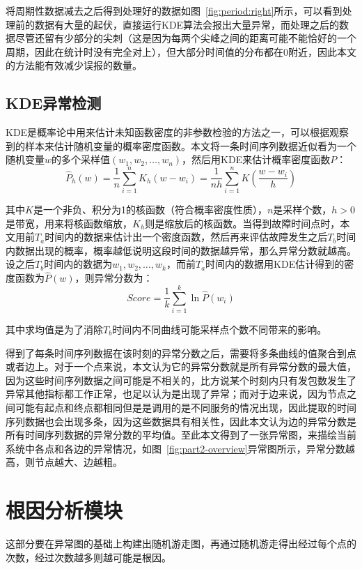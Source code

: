 将周期性数据减去之后得到处理好的数据如图~\ref{fig:period:right}所示，可以看到处理前的数据有大量的起伏，直接运行KDE算法会报出大量异常，而处理之后的数据尽管还留有少部分的尖刺（这是因为每两个尖峰之间的距离可能不能恰好的一个周期，因此在统计时没有完全对上），但大部分时间值的分布都在0附近，因此本文的方法能有效减少误报的数量。

\subsection{KDE异常检测}
KDE是概率论中用来估计未知函数密度的非参数检验的方法之一，可以根据观察到的样本来估计随机变量的概率密度函数。本文将一条时间序列数据近似看为一个随机变量$w$的多个采样值$(w_1,w_2,\dots,w_n)$，然后用KDE来估计概率密度函数$P$：
\begin{equation*}
\hat{P}_h(w) = \frac{1}{n}\sum_{i=1}^nK_h(w-w_i) = \frac{1}{nh}\sum_{i=1}^nK(\frac{w-w_i}{h})
\end{equation*}

其中$K$是一个非负、积分为1的核函数（符合概率密度性质），$n$是采样个数，$h>0$是带宽，用来将核函数缩放，$K_h$则是缩放后的核函数。当得到故障时间点时，本文用前$T_a$时间内的数据来估计出一个密度函数，然后再来评估故障发生之后$T_b$时间内数据出现的概率，概率越低说明这段时间的数据越异常，那么异常分数就越高。设之后$T_b$时间内的数据为$w_1,w_2,\dots,w_k$，而前$T_a$时间内的数据用KDE估计得到的密度函数为$\hat{P}(w)$，则异常分数为：
\begin{equation*}
  Score = \frac{1}{k}\sum_{i=1}^k\ln \hat{P}(w_i)
\end{equation*}

其中求均值是为了消除$T_b$时间内不同曲线可能采样点个数不同带来的影响。

得到了每条时间序列数据在该时刻的异常分数之后，需要将多条曲线的值聚合到点或者边上。对于一个点来说，本文认为它的异常分数就是所有异常分数的最大值，因为这些时间序列数据之间可能是不相关的，比方说某个时刻内只有发包数发生了异常其他指标都工作正常，也足以认为是出现了异常；而对于边来说，因为节点之间可能有起点和终点都相同但是是调用的是不同服务的情况出现，因此提取的时间序列数据也会出现多条，因为这些数据具有相关性，因此本文认为边的异常分数是所有时间序列数据的异常分数的平均值。至此本文得到了一张异常图，来描绘当前系统中各点和各边的异常情况，如图~\ref{fig:part2-overview}异常图所示，异常分数越高，则节点越大、边越粗。
\section{根因分析模块}
这部分要在异常图的基础上构建出随机游走图，再通过随机游走得出经过每个点的次数，经过次数越多则越可能是根因。


